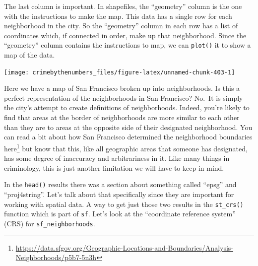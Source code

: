 \documentclass[
]{krantz}
\makeatletter
\newenvironment{Shaded}{\begin{snugshade}}{\end{snugshade}}
\newcommand{\FunctionTok}[1]{\textcolor[rgb]{0,0,0}{#1}}
\newcommand{\NormalTok}[1]{#1}
\newcommand{\SpecialCharTok}[1]{\textcolor[rgb]{0,0,0}{#1}}
\renewcommand{\href}[2]{#2\footnote{\url{#1}}}
\newenvironment{kframe}{%
\medskip{}
\setlength{\fboxsep}{.8em}
 \def\at@end@of@kframe{}%
 \ifinner\ifhmode%
  \def\at@end@of@kframe{\end{minipage}}%
  \begin{minipage}{\columnwidth}%
 \fi\fi%
 \def\FrameCommand##1{\hskip\@totalleftmargin \hskip-\fboxsep
 \colorbox{shadecolor}{##1}\hskip-\fboxsep
     \hskip-\linewidth \hskip-\@totalleftmargin \hskip\columnwidth}%
 \MakeFramed {\advance\hsize-\width
   \@totalleftmargin\z@ \linewidth\hsize
   \@setminipage}}%
 {\par\unskip\endMakeFramed%
 \at@end@of@kframe}
\renewenvironment{Shaded}{\begin{kframe}}{\end{kframe}}
\makeatother
\begin{document}
The last column is important. In shapefiles, the ``geometry'' column is the one with the instructions to make the map. This data has a single row for each neighborhood in the city. So the ``geometry'' column in each row has a list of coordinates which, if connected in order, make up that neighborhood. Since the ``geometry'' column contains the instructions to map, we can \texttt{plot()} it to show a map of the data.

\begin{Shaded}
\end{Shaded}

\begin{center}\texttt{[image: crimebythenumbers\_files/figure-latex/unnamed-chunk-403-1]} \end{center}

Here we have a map of San Francisco broken up into neighborhoods. Is this a perfect representation of the neighborhoods in San Francisco? No.~It is simply the city's attempt to create definitions of neighborhoods. Indeed, you're likely to find that areas at the border of neighborhoods are more similar to each other than they are to areas at the opposite side of their designated neighborhood. You can read a bit about how San Francisco determined the neighborhood boundaries \href{https://data.sfgov.org/Geographic-Locations-and-Boundaries/Analysis-Neighborhoods/p5b7-5n3h}{here} but know that this, like all geographic areas that someone has designated, has some degree of inaccuracy and arbitrariness in it. Like many things in criminology, this is just another limitation we will have to keep in mind.

In the \texttt{head()} results there was a section about something called ``epsg'' and ``proj4string''. Let's talk about that specifically since they are important for working with spatial data. A way to get just those two results in the \texttt{st\_crs()} function which is part of \texttt{sf}. Let's look at the ``coordinate reference system'' (CRS) for \texttt{sf\_neighborhoods}.
\end{document}
